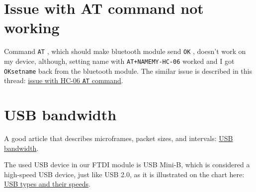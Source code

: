 \documentclass[12pt]{book}
\newcommand{\code}[1]{
    {\color{blue}\texttt{#1}}
}
\begin{document}
\section{Issue with AT command not working}
Command \code{AT}, which should make bluetooth module send \code{OK}, doesn't work on my device, although, setting name
with \code{AT+NAMEMY-HC-06} worked and I got \code{OKsetname} back from the bluetooth module. The similar issue is 
described in this thread: \href{https://forum.arduino.cc/t/solved-hc-06-just-wont-talk-with-windows-for-at-commands/665785/8}{
issue with HC-06 \code{AT} command}.

\section{USB bandwidth}
A good article that describes microframes, packet sizes, and intervals: 
\href{https://www.thegoodpenguin.co.uk/blog/understanding-why-usb-isochronous-bandwidth-errors-occur/}{USB bandwidth}.

The used USB device in our FTDI module is USB Mini-B, which is considered a high-speed USB device, just like USB 2.0, as 
it is illustrated on the chart here: \href{https://www.centralcomputer.com/usb-comparison-chart}{USB types and their speeds}.
\end{document}
